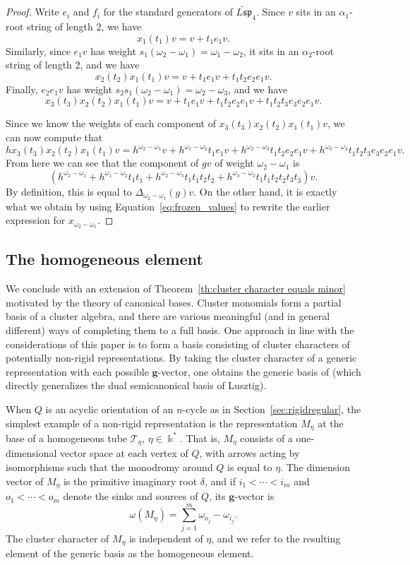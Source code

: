 \documentclass[12pt]{amsart}
\newcommand{\sayDR}[1]{\say[DR]{\color{red}{\bf DR:}\;#1}}
\newcommand{\kk}{\Bbbk}
\newcommand{\bfg}{\mathbf{g}}
\newcommand{\gv}{\omega}
\newcommand{\grep}{\gv}
\newcommand{\ol}[1]{\overline{#1}}
\newcommand{\Qrep}{M}
\theoremstyle{remark}
\numberwithin{equation}{section}
\numberwithin{figure}{section}
\begin{document}
\begin{proof}
  Write $e_i$ and $f_i$ for the standard generators of $\widetilde{L\mathfrak{sp}}_4$.
  Since $v$ sits in an $\alpha_1$-root string of length 2, we have
  \[
    x_1(t_1)v = v + t_1e_1v.
  \]
  Similarly, since $e_1v$ has weight $s_1(\omega_2 - \omega_1) = \omega_1 - \omega_2$, it sits in an $\alpha_2$-root string of length 2, and we have
  \[
    x_2(t_2)x_1(t_1)v = v + t_1e_1v + t_1t_2e_2e_1v.
  \]
  Finally, $e_2e_1v$ has weight $s_2s_1(\omega_2 - \omega_1) = \omega_2 - \omega_3$, and we have
  \[
    x_3(t_3)x_2(t_2)x_1(t_1)v = v + t_1e_1v + t_1t_2e_2e_1v + t_1t_2t_3e_3e_2e_1v.
  \]

  Since we know the weights of each component of $x_3(t_3)x_2(t_2)x_1(t_1)v$, we can now compute that
  \[
    hx_3(t_3)x_2(t_2)x_1(t_1)v = h^{\omega_2-\omega_1}v + h^{\omega_1 - \omega_2}t_1e_1v + h^{\omega_2-\omega_3}t_1t_2e_2e_1v + h^{\omega_3-\omega_2}t_1t_2t_3e_3e_2e_1v.
  \]
  From here we can see that the component of $gv$ of weight $\omega_2 - \omega_1$ is
  \[
    (h^{\omega_2-\omega_1} + h^{\omega_1 - \omega_2}t_1t_{\ol{1}} + h^{\omega_2-\omega_3}t_1t_{\ol{1}}t_2t_{\ol{2}} + h^{\omega_3-\omega_2}t_1t_{\ol{1}}t_2t_{\ol{2}}t_3t_{\ol{3}})v.
  \]
  By definition, this is equal to $\Delta_{\omega_2-\omega_1}(g)v$.
  On the other hand, it is exactly what we obtain by using Equation~\eqref{eq:frozen_values} to rewrite the earlier expression for $x_{\omega_2 - \omega_1}$.
\end{proof}

\subsection{The homogeneous element}
We conclude with an extension of Theorem~\ref{th:cluster character equals minor} motivated by the theory of canonical bases.
Cluster monomials form a partial basis of a cluster algebra, and there are various meaningful (and in general different) ways of completing them to a full basis.
One approach in line with the considerations of this paper is to form a basis consisting of cluster characters of potentially non-rigid representations.
By taking the cluster character of a generic representation with each possible $\bfg$-vector, one obtains the generic basis of \cite{Dup12} (which directly generalizes the dual semicanonical basis of Lusztig).%

When $Q$ is an acyclic orientation of an $n$-cycle as in Section~\ref{sec:rigidregular}, the simplest example of a non-rigid representation is the representation $\Qrep_\eta$ at the base of a homogeneous tube $\mathcal{T}_\eta$, $\eta \in \kk^*$.
That is, $\Qrep_\eta$ consists of a one-dimensional vector space at each vertex of $Q$, with arrows acting by isomorphisms such that the monodromy around $Q$ is equal to $\eta$.
The dimension vector of $\Qrep_\eta$ is the primitive imaginary root $\delta$, and if $i_1<\cdots<i_m$ and $o_1<\cdots < o_m$ denote the sinks and sources of $Q$, its $\bfg$-vector is
\[
  \grep(\Qrep_\eta) = \sum_{j=1}^m \omega_{o_j} - \omega_{i_j}.
\]
The cluster character of $\Qrep_\eta$ is independent of $\eta$, and we refer to the resulting element of the generic basis as the homogeneous element.
\end{document}
